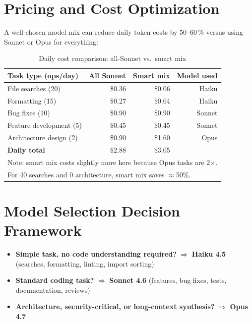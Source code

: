 \section{Pricing and Cost Optimization}
\label{sec:model-pricing}


A well-chosen model mix can reduce daily token costs by 50–60\,\% versus
using Sonnet or Opus for everything:

\begin{table}[ht]
\centering
\caption{Daily cost comparison: all-Sonnet vs.\ smart mix}
\label{tab:model-cost}
\begin{tabularx}{\textwidth}{Xrrr}
\toprule
\textbf{Task type (ops/day)} & \textbf{All Sonnet} & \textbf{Smart mix} & \textbf{Model used} \\
\midrule
File searches (20)       & \$0.36 & \$0.06 & Haiku \\
Formatting (15)          & \$0.27 & \$0.04 & Haiku \\
Bug fixes (10)           & \$0.90 & \$0.90 & Sonnet \\
Feature development (5)  & \$0.45 & \$0.45 & Sonnet \\
Architecture design (2)  & \$0.90 & \$1.60 & Opus \\
\midrule
\textbf{Daily total}     & \$2.88 & \$3.05 & \\
\multicolumn{4}{l}{\small Note: smart mix costs slightly more here because Opus tasks are 2×.} \\
\multicolumn{4}{l}{\small For 40 searches and 0 architecture, smart mix saves $\approx$50\%.} \\
\bottomrule
\end{tabularx}
\end{table}

\section{Model Selection Decision Framework}
\label{sec:model-decision}


\begin{itemize}
  \item \textbf{Simple task, no code understanding required?}
        $\Rightarrow$ \textbf{Haiku 4.5}
        (searches, formatting, linting, import sorting)
  \item \textbf{Standard coding task?}
        $\Rightarrow$ \textbf{Sonnet 4.6}
        (features, bug fixes, tests, documentation, reviews)
  \item \textbf{Architecture, security-critical, or long-context synthesis?}
        $\Rightarrow$ \textbf{Opus 4.7}
\end{itemize}

